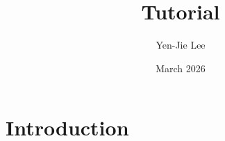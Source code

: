 \documentclass{article}
\title{Tutorial}
\author{Yen-Jie Lee}
\date{March 2026}
\begin{document}
\maketitle

\section{Introduction}
\end{document}
